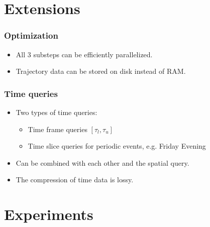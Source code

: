 \documentclass[10pt, t,
aspectratio=169,%
]{beamer}
\newcommand{\getAssociatedTrajectories}{GetAssociatedTrajectories\xspace}
\begin{document}
%

\section{Extensions}

\begin{frame}
	\frametitle{Optimization}
	\begin{itemize}
		\item<1-> All 3 substeps can be efficiently parallelized.
		\item<2-> Trajectory data can be stored on disk instead of RAM.
	\end{itemize}
\end{frame}

\begin{frame}
	\frametitle{Time queries}
	\begin{itemize}

		\item	Two types of time queries: \pause
		      \begin{itemize}
			      \item Time frame queries $[\tau_l, \tau_u]$ \pause
			      \item Time slice queries for periodic events, e.g. Friday Evening \pause
		      \end{itemize}

		\item Can be combined with each other and the spatial query. \pause

		\item The compression of time data is lossy.
	\end{itemize}
\end{frame}

\section{Experiments}
\end{document}
